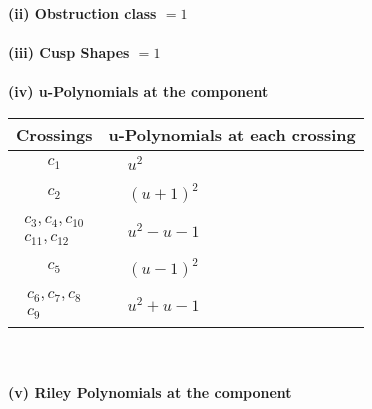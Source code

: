 \documentclass[1p]{elsarticle_modified}
\theoremstyle{definition}
\begin{document}
\flushleft \textbf{(ii) Obstruction class $= 1$}\\~\\
\flushleft \textbf{(iii) Cusp Shapes $= 1$}\\~\\
\newpage\renewcommand{\arraystretch}{1}
\flushleft \textbf{(iv) u-Polynomials at the component}\newline \\
\begin{tabular}{m{50pt}|m{274pt}}
Crossings & \hspace{64pt}u-Polynomials at each crossing \\
\hline $$\begin{aligned}c_{1}\end{aligned}$$&$\begin{aligned}
&u^2
\end{aligned}$\\
\hline $$\begin{aligned}c_{2}\end{aligned}$$&$\begin{aligned}
&(u+1)^2
\end{aligned}$\\
\hline $$\begin{aligned}c_{3},c_{4},c_{10}\\c_{11},c_{12}\end{aligned}$$&$\begin{aligned}
&u^2- u-1
\end{aligned}$\\
\hline $$\begin{aligned}c_{5}\end{aligned}$$&$\begin{aligned}
&(u-1)^2
\end{aligned}$\\
\hline $$\begin{aligned}c_{6},c_{7},c_{8}\\c_{9}\end{aligned}$$&$\begin{aligned}
&u^2+u-1
\end{aligned}$\\
\hline
\end{tabular}\\~\\
\newpage\renewcommand{\arraystretch}{1}
\flushleft \textbf{(v) Riley Polynomials at the component}\newline \\
\end{document}
